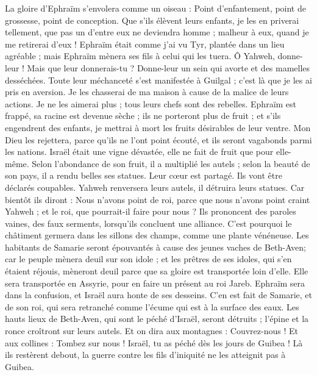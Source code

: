 \begin{multicols}{2}
La gloire d'Ephraïm s'envolera comme un oiseau : Point d'enfantement, point de grossesse, point de conception.
Que s'ils élèvent leurs enfants, je les en priverai tellement, que pas un d'entre eux ne deviendra homme ; malheur à eux, quand je me retirerai d'eux !
Ephraïm était comme j'ai vu Tyr, plantée dans un lieu agréable ; mais Ephraïm mènera ses fils à celui qui les tuera.
Ô Yahweh, donne-leur ! Mais que leur donnerais-tu ? Donne-leur un sein qui avorte et des mamelles desséchées.
Toute leur méchanceté s'est manifestée à Guilgal ; c'est là que je les ai pris en aversion. Je les chasserai de ma maison à cause de la malice de leurs actions. Je ne les aimerai plus ; tous leurs chefs sont des rebelles.
Ephraïm est frappé, sa racine est devenue sèche ; ils ne porteront plus de fruit ; et s'ils engendrent des enfants, je mettrai à mort les fruits désirables de leur ventre.
Mon Dieu les rejettera, parce qu'ils ne l'ont point écouté, et ils seront vagabonds parmi les nations.
\VerseOne{}Israël était une vigne dévastée, elle ne fait de fruit que pour elle-même. Selon l'abondance de son fruit, il a multiplié les autels ; selon la beauté de son pays, il a rendu belles ses statues.
Leur cœur est partagé. Ils vont être déclarés coupables. Yahweh renversera leurs autels, il détruira leurs statues.
Car bientôt ils diront : Nous n'avons point de roi, parce que nous n'avons point craint Yahweh ; et le roi, que pourrait-il faire pour nous ?
Ils prononcent des paroles vaines, des faux serments, lorsqu'ils concluent une alliance. C'est pourquoi le châtiment germera dans les sillons des champs, comme une plante vénéneuse.
Les habitants de Samarie seront épouvantés à cause des jeunes vaches de Beth-Aven; car le peuple mènera deuil sur son idole ; et les prêtres de ses idoles, qui s'en étaient réjouis, mèneront deuil parce que sa gloire est transportée loin d'elle.
Elle sera transportée en Assyrie, pour en faire un présent au roi Jareb. Ephraïm sera dans la confusion, et Israël aura honte de ses desseins.
C'en est fait de Samarie, et de son roi, qui sera retranché comme l'écume qui est à la surface des eaux.
Les hauts lieux de Beth-Aven, qui sont le péché d'Israël, seront détruits ; l'épine et la ronce croîtront sur leurs autels. Et on dira aux montagnes : Couvrez-nous ! Et aux collines : Tombez sur nous !
Israël, tu as péché dès les jours de Guibea ! Là ils restèrent debout, la guerre contre les fils d'iniquité ne les atteignit pas à Guibea.

\end{multicols}
